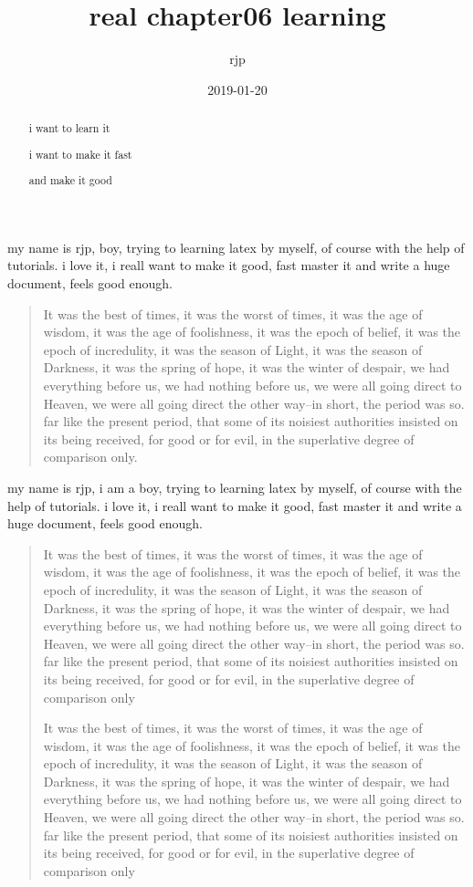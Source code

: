 \documentclass[a4paper, UTF8]{article}
\begin{document}
\title{real chapter06 learning}
\author{rjp}
\date{2019-01-20}
\maketitle

\begin{abstract}
    i want to learn it 

    i want to make it fast

    and make it good
\end{abstract}
\newpage

my name is rjp, boy, trying to learning latex by myself, of course with the help of tutorials. i love it, i reall want to make it good, fast master it and write a huge document, feels good enough.

\begin{quote}
    It was the best of times, it was the worst of times, it was the age of wisdom, it was the age of foolishness, it was the epoch of belief, it was the epoch of incredulity, it was the season of Light, it was the season of Darkness, it was the spring of hope, it was the winter of despair, we had everything before us, we had nothing before us, we were all going direct to Heaven, we were all going direct the other way--in short, the period was so. far like the present period, that some of its noisiest authorities insisted on its being received, for good or for evil, in the superlative degree of comparison only.
\end{quote}

my name is rjp, i am a boy, trying to learning latex by myself, of course with the help of tutorials. i love it, i reall want to make it good, fast master it and write a huge document, feels good enough.

\begin{quotation}
    It was the best of times, it was the worst of times, it was the age of wisdom, it was the age of foolishness, it was the epoch of belief, it was the epoch of incredulity, it was the season of Light, it was the season of Darkness, it was the spring of hope, it was the winter of despair, we had everything before us, we had nothing before us, we were all going direct to Heaven, we were all going direct the other way--in short, the period was so. far like the present period, that some of its noisiest authorities insisted on its being received, for good or for evil, in the superlative degree of comparison only

    It was the best of times, it was the worst of times, it was the age of wisdom, it was the age of foolishness, it was the epoch of belief, it was the epoch of incredulity, it was the season of Light, it was the season of Darkness, it was the spring of hope, it was the winter of despair, we had everything before us, we had nothing before us, we were all going direct to Heaven, we were all going direct the other way--in short, the period was so. far like the present period, that some of its noisiest authorities insisted on its being received, for good or for evil, in the superlative degree of comparison only
\end{quotation}
\end{document}
